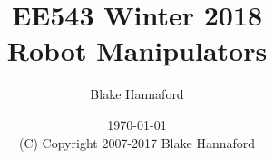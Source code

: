 \documentclass[oneside]{book}
\begin{document}
\setpagewiselinenumbers
\modulolinenumbers[5]

\setcounter{chapter}{0}



 \title{EE543  Winter 2018\\Robot Manipulators}

 \author{Blake Hannaford}

 \date{\today\\(C) Copyright 2007-2017 Blake Hannaford}

 \maketitle

\tableofcontents

\mainmatter

\linenumbers

 
%
%

\appendix



%
\label{LastPage}
\end{document}
